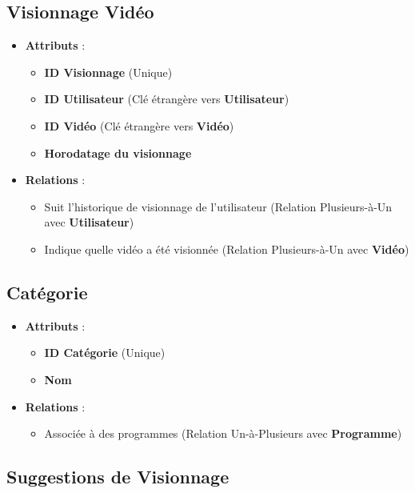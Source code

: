 \documentclass{article}
\begin{document}
\subsection{Visionnage Vidéo}

\begin{itemize}
    \item \textbf{Attributs} :
    \begin{itemize}
        \item \textbf{ID Visionnage} (Unique)
        \item \textbf{ID Utilisateur} (Clé étrangère vers \textbf{Utilisateur})
        \item \textbf{ID Vidéo} (Clé étrangère vers \textbf{Vidéo})
        \item \textbf{Horodatage du visionnage}
    \end{itemize}
    \item \textbf{Relations} :
    \begin{itemize}
        \item Suit l'historique de visionnage de l'utilisateur (Relation Plusieurs-à-Un avec \textbf{Utilisateur})
        \item Indique quelle vidéo a été visionnée (Relation Plusieurs-à-Un avec \textbf{Vidéo})
    \end{itemize}
\end{itemize}

\subsection{Catégorie}

\begin{itemize}
    \item \textbf{Attributs} :
    \begin{itemize}
        \item \textbf{ID Catégorie} (Unique)
        \item \textbf{Nom}
    \end{itemize}
    \item \textbf{Relations} :
    \begin{itemize}
        \item Associée à des programmes (Relation Un-à-Plusieurs avec \textbf{Programme})
    \end{itemize}
\end{itemize}

\subsection{Suggestions de Visionnage}
\end{document}
